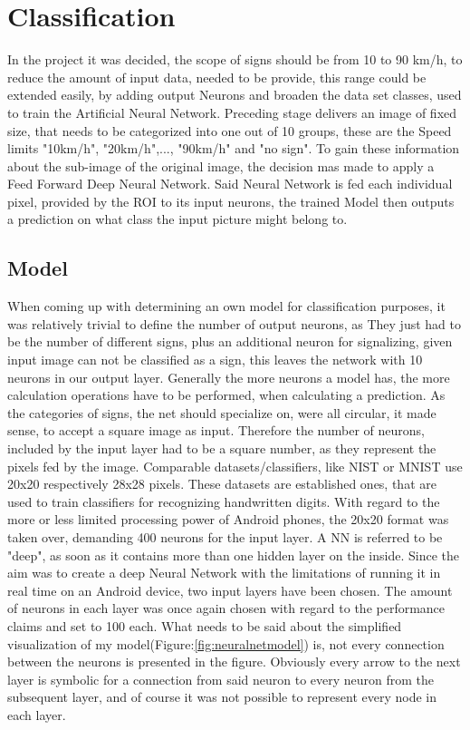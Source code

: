 \section{Classification}
In the project it was decided, the scope of signs should be from 10 to 90 km/h, to reduce the amount of input data, needed to be provide, this range could be extended easily, by adding output Neurons and broaden the data set classes, used to train the Artificial Neural Network. \newline\newline
Preceding stage delivers an image of fixed size, that needs to be categorized into one out of 10 groups, these are the Speed limits "10km/h", "20km/h",..., "90km/h" and "no sign". To gain these information about the sub-image of the original image, the decision mas made to apply a Feed Forward Deep Neural Network. Said Neural Network is fed each individual pixel, provided by the ROI to its input neurons, the trained Model then outputs a prediction on what class the input picture might belong to.
\newline

\subsection{Model}
When coming up with determining an own model for classification purposes, it was relatively trivial to define the number of output neurons, as They just had to be the number of different signs, plus an additional neuron for signalizing, given input image can not be classified as a sign, this leaves the network with 10 neurons in our output layer. Generally the more neurons a model has, the more calculation operations have to be performed, when calculating a prediction.\newline
As the categories of signs, the net should specialize on, were all circular, it made sense, to accept a square image as input. Therefore the number of neurons, included by the input layer had to be a square number, as they represent the pixels fed by the image. Comparable datasets/classifiers, like NIST or MNIST\cite{mnist} use 20x20 respectively 28x28 pixels. These datasets are established ones, that are used to train classifiers for recognizing handwritten digits. With regard to the more or less limited processing power of Android phones, the 20x20 format was taken over, demanding 400 neurons for the input layer. \newline
A NN is referred to be "deep", as soon as it contains more than one hidden layer on the inside.
Since the aim was to create a deep Neural Network with the limitations of running it in real time on an Android device, two input layers have been chosen. The amount of neurons in each layer was once again chosen with regard to the performance claims and set to 100 each.\newline
What needs to be said about the simplified visualization of my model(Figure:\ref{fig:neuralnetmodel}) is, not every connection between the neurons is presented in the figure. Obviously every arrow to the next layer is symbolic for a connection from said neuron to every neuron from the subsequent layer, and of course it was not possible to represent every node in each layer.


